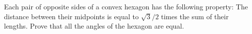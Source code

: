 Each pair of opposite sides of a convex hexagon has the following property: The distance between their midpoints is equal to $\sqrt{3}/2$ times the sum of their lengths. Prove that all the angles of the hexagon are equal.
